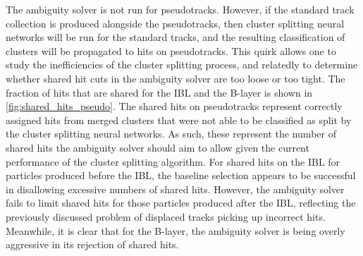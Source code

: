 The ambiguity solver is not run for pseudotracks.
However, if the standard track collection is produced alongside the pseudotracks, then cluster splitting neural networks will be run for the standard tracks, and the resulting classification of clusters will be propagated to hits on pseudotracks.
This quirk allows one to study the inefficiencies of the cluster splitting process, and relatedly to determine whether shared hit cuts in the ambiguity solver are too loose or too tight.
The fraction of hits that are shared for the IBL and the B-layer is shown in \cref{fig:shared_hits_pseudo}.
The shared hits on pseudotracks represent correctly assigned hits from merged clusters that were not able to be classified as split by the cluster splitting neural networks.
As such, these represent the number of shared hits the ambiguity solver should aim to allow given the current performance of the cluster splitting algorithm.
For shared hits on the IBL for particles produced before the IBL, the baseline selection appears to be successful in disallowing excessive numbers of shared hits.
However, the ambiguity solver fails to limit shared hits for those particles produced after the IBL, reflecting the previously discussed problem of displaced tracks picking up incorrect hits.
Meanwhile, it is clear that for the B-layer, the ambiguity solver is being overly aggressive in its rejection of shared hits.

